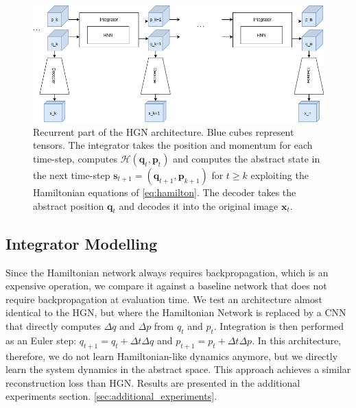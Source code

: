\begin{figure}[h]
\centering
\includegraphics[width=\textwidth]{pictures/rollout_architecture.png}
\caption{Recurrent part of the HGN architecture. Blue cubes represent tensors. The integrator takes the position and momentum for each time-step, computes $\mathcal{H}(\bm{q}_t, \bm{p}_t)$ and computes the abstract state in the next time-step $\bm{s}_{t+1} = (\bm{q}_{t+1}, \bm{p}_{k+1})$ for $t\ge k$ exploiting the Hamiltonian equations of \ref{eq:hamilton}. The decoder takes the abstract position $\bm{q}_{t}$ and decodes it into the original image $\bm{x}_t$.}
\label{fig:unroll}
\end{figure}


\subsection{Integrator Modelling}
\label{sec:integrator_modelling}
Since the Hamiltonian network always requires backpropagation, which is an expensive operation, we compare it against a baseline network that does not require backpropagation at evaluation time. We test an architecture almost identical to the HGN, but where the Hamiltonian Network is replaced by a CNN that directly computes $\Delta q$ and $\Delta p$ from $q_t$ and $p_t$. Integration is then performed as an Euler step: $q_{t+1} = q_t + \Delta t \Delta q$ and $p_{t+1} = p_t + \Delta t \Delta p$. In this architecture, therefore, we do not learn Hamiltonian-like dynamics anymore, but we directly learn the system dynamics in the abstract space. This approach achieves a similar reconstruction loss than HGN\cite{hgn}.
Results are presented in the additional experiments section.  \ref{sec:additional_experiments}.


